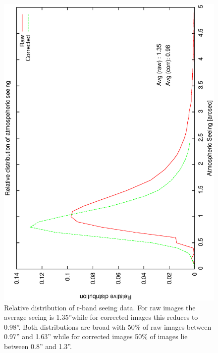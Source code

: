 {{\begin{figure}[htbp]
\begin{center}
    \includegraphics[scale=0.4, angle=-90]{figures/ecs/seeing_dist.eps}
\end{center} 
\caption[Relative distribution of r-band seeing data.] {Relative distribution of r-band seeing data. For raw images the average seeing is 1.35''while for corrected images this reduces to 0.98''. Both distributions are broad with 50\% of raw images between 0.97'' and 1.63'' while for corrected images 50\% of images lie between 0.8'' and 1.3''.}
\label{fig:see_dist}
\end{figure}

}}
